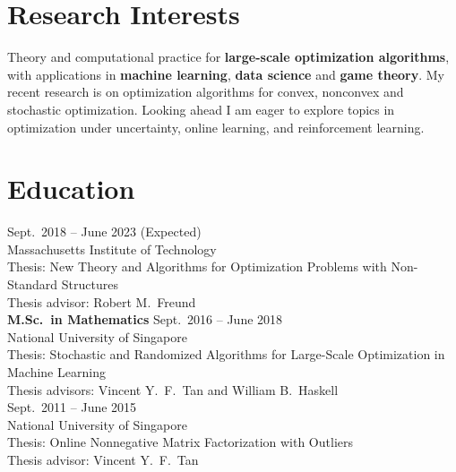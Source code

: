 \documentclass[11pt]{article}
\begin{document}
\section*{\large Research Interests}

\noindent Theory and computational practice for {\bf large-scale optimization algorithms}, with applications in {\bf machine learning}, {\bf data science} and {\bf game theory}.  My recent  research is on optimization algorithms for  convex, nonconvex and stochastic optimization. Looking ahead I am eager to explore topics in optimization under uncertainty, online learning, and reinforcement learning. 



\section*{\large Education}


 \hfill Sept.\ 2018 -- June 2023 (Expected)\\
{Massachusetts Institute of Technology} \\ %
{Thesis}: {New Theory and Algorithms for Optimization Problems with Non-Standard Structures} \\
{ Thesis advisor}: {Robert M.\ Freund}\\

{\noindent \bf M.Sc.\ in Mathematics}  \hfill Sept.\ 2016 -- June 2018\\
  {National University of Singapore}\\
{ Thesis}: {Stochastic and Randomized Algorithms for Large-Scale Optimization in Machine Learning} \\
{ Thesis advisors}: {Vincent Y.\ F.\ Tan and William B.\ Haskell}\\


 \hfill Sept.\ 2011  -- June 2015\\
{National University of Singapore} \\   %
{ Thesis}: {Online Nonnegative Matrix Factorization with Outliers}\\%
{ Thesis advisor}: {Vincent Y.\ F.\ Tan}
\end{document}
